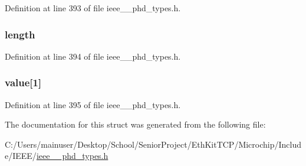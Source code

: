 Definition at line 393 of file ieee\+\_\+\_\+phd\+\_\+types.\+h.

\hypertarget{struct___segm_entry_elem_list_a3743679e4ff85e3e1b3fc2e59973fbb3}{}
\subsubsection[{length}]{ length}\label{struct___segm_entry_elem_list_a3743679e4ff85e3e1b3fc2e59973fbb3}


Definition at line 394 of file ieee\+\_\+\_\+phd\+\_\+types.\+h.

\hypertarget{struct___segm_entry_elem_list_a345d78086f1ff5d9773550cb1f4de9f1}{}
\subsubsection[{value}]{ value\mbox{[}1\mbox{]}}\label{struct___segm_entry_elem_list_a345d78086f1ff5d9773550cb1f4de9f1}


Definition at line 395 of file ieee\+\_\+\_\+phd\+\_\+types.\+h.



The documentation for this struct was generated from the following file\+:\begin{DoxyCompactItemize}
\item 
C\+:/\+Users/mainuser/\+Desktop/\+School/\+Senior\+Project/\+Eth\+Kit\+T\+C\+P/\+Microchip/\+Include/\+I\+E\+E\+E/\hyperlink{ieee__11073__phd__types_8h}{ieee\+\_\+\_\+phd\+\_\+types.\+h}\end{DoxyCompactItemize}

